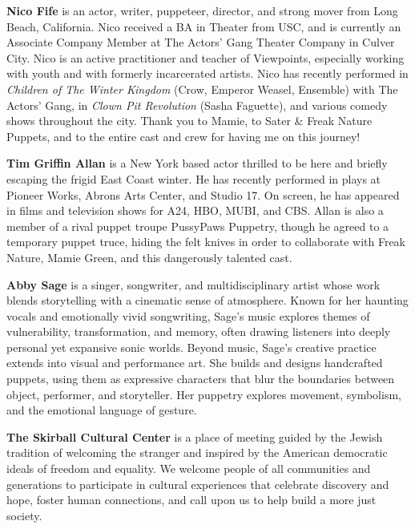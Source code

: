 \documentclass[10pt,letterpaper,landscape]{article}
\newlength{\panelwidth}
\newlength{\panelheight}
\newcommand{\panel}[1]{%
  \begin{minipage}[t][\panelheight][t]{\panelwidth}%
    \raggedright #1%
  \end{minipage}%
}
\newcommand{\panellabel}[1]{}
\newcommand{\biosize}{\fontsize{5.65}{6.35}\selectfont}
\begin{document}
\panel{
  \panellabel{Outer Flap}
  \biosize
  \textbf{Nico Fife} is an actor, writer, puppeteer, director, and strong mover from Long Beach, California. Nico received a BA in Theater from USC, and is currently an Associate Company Member at The Actors' Gang Theater Company in Culver City. Nico is an active practitioner and teacher of Viewpoints, especially working with youth and with formerly incarcerated artists. Nico has recently performed in \textit{Children of The Winter Kingdom} (Crow, Emperor Weasel, Ensemble) with The Actors' Gang, in \textit{Clown Pit Revolution} (Sasha Faguette), and various comedy shows throughout the city. Thank you to Mamie, to Sater \& Freak Nature Puppets, and to the entire cast and crew for having me on this journey!

  \textbf{Tim Griffin Allan} is a New York based actor thrilled to be here and briefly escaping the frigid East Coast winter. He has recently performed in plays at Pioneer Works, Abrons Arts Center, and Studio 17. On screen, he has appeared in films and television shows for A24, HBO, MUBI, and CBS. Allan is also a member of a rival puppet troupe PussyPaws Puppetry, though he agreed to a temporary puppet truce, hiding the felt knives in order to collaborate with Freak Nature, Mamie Green, and this dangerously talented cast.

  \textbf{Abby Sage} is a singer, songwriter, and multidisciplinary artist whose work blends storytelling with a cinematic sense of atmosphere. Known for her haunting vocals and emotionally vivid songwriting, Sage's music explores themes of vulnerability, transformation, and memory, often drawing listeners into deeply personal yet expansive sonic worlds. Beyond music, Sage's creative practice extends into visual and performance art. She builds and designs handcrafted puppets, using them as expressive characters that blur the boundaries between object, performer, and storyteller. Her puppetry explores movement, symbolism, and the emotional language of gesture.

  \textbf{The Skirball Cultural Center} is a place of meeting guided by the Jewish tradition of welcoming the stranger and inspired by the American democratic ideals of freedom and equality. We welcome people of all communities and generations to participate in cultural experiences that celebrate discovery and hope, foster human connections, and call upon us to help build a more just society.
}

\newpage
\end{document}
